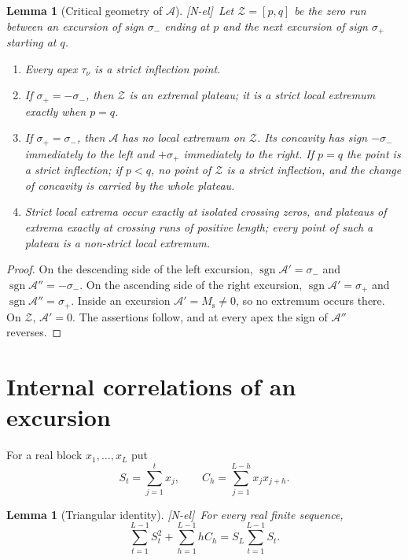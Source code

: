\documentclass[11pt]{amsart}
\numberwithin{equation}{section}
\theoremstyle{plain}
\newtheorem{lemma}[theorem]{Lemma}
\theoremstyle{definition}
\theoremstyle{remark}
\DeclareMathOperator{\sgn}{sgn}
\newcommand{\Ms}{M_{\mathrm{s}}}
\newcommand{\Anet}{\mathcal{A}}
\newcommand{\tagNE}{\textup{[N-el]}}
\begin{document}
\begin{lemma}[Critical geometry of $\Anet$]
\label{lem:critical}
\tagNE\ Let $\mathcal Z=[p,q]$ be the zero run between an excursion of sign $\sigma_-$ ending
at $p$ and the next excursion of sign $\sigma_+$ starting at $q$.
\begin{enumerate}[label=\textup{(\roman*)}]
\item Every apex $\tau_\nu$ is a strict inflection point.
\item If $\sigma_+=-\sigma_-$, then $\mathcal Z$ is an extremal plateau; it is a
strict local extremum exactly when $p=q$.
\item If $\sigma_+=\sigma_-$, then $\Anet$ has no local extremum on
$\mathcal Z$. Its concavity has sign $-\sigma_-$ immediately to the left
and $+\sigma_+$ immediately to the right. If $p=q$ the point is a strict inflection; if
$p<q$, no point of $\mathcal Z$ is a strict inflection, and the change of concavity
is carried by the whole plateau.
\item Strict local extrema occur exactly at isolated crossing zeros, and
plateaus of extrema exactly at crossing runs of positive length; every point
of such a plateau is a non-strict local extremum.
\end{enumerate}
\end{lemma}

\begin{proof}
On the descending side of the left excursion,
$\sgn\Anet'=\sigma_-$ and $\sgn\Anet''=-\sigma_-$. On the ascending side of
the right excursion, $\sgn\Anet'=\sigma_+$ and $\sgn\Anet''=\sigma_+$. Inside an excursion
$\Anet'=\Ms\ne0$, so no extremum occurs there. On
$\mathcal Z$, $\Anet'=0$. The assertions follow, and at every apex the sign of
$\Anet''$ reverses.
\end{proof}


\section{Internal correlations of an excursion}
\label{sec:internal_corr}

For a real block $x_1,\dots,x_L$ put
\begin{equation}
\label{eq:block_def}
S_t=\sum_{j=1}^t x_j,\qquad
C_h=\sum_{j=1}^{L-h}x_jx_{j+h}.
\end{equation}

\begin{lemma}[Triangular identity]
\label{lem:triangular-corr}
\tagNE\ For every real finite sequence,
\begin{equation}
\label{eq:general-triangular}
\sum_{t=1}^{L-1}S_t^2+\sum_{h=1}^{L-1}hC_h
=S_L\sum_{t=1}^{L-1}S_t.
\end{equation}
\end{lemma}
\end{document}
